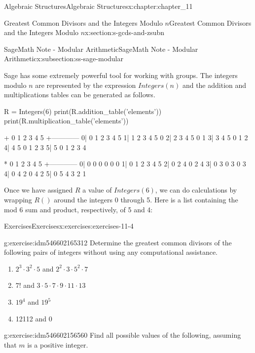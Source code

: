 \documentclass[oneside,10pt,]{book}
\numberwithin{equation}{section}
\begin{document}
\begin{chapterptx}{Algebraic Structures}{}{Algebraic Structures}{}{}{x:chapter:chapter_11}
\begin{sectionptx}{Greatest Common Divisors  and the Integers Modulo \(n\)}{}{Greatest Common Divisors  and the Integers Modulo \(n\)}{}{}{x:section:s-gcds-and-zsubn}
\begin{subsectionptx}{SageMath Note - Modular Arithmetic}{}{SageMath Note - Modular Arithmetic}{}{}{x:subsection:ss-sage-modular}
\begin{sageoutput}
\end{sageoutput}
Sage has some extremely powerful tool for working with groups.  The integers modulo \(n\) are represented by the expression \(Integers(n)\) and the addition and multiplications tables can be generated as follows.%
\begin{sageinput}
R = Integers(6)
print(R.addition_table('elements'))
print(R.multiplication_table('elements'))
\end{sageinput}
\begin{sageoutput}
+  0 1 2 3 4 5
 +------------  
0| 0 1 2 3 4 5
1| 1 2 3 4 5 0
2| 2 3 4 5 0 1
3| 3 4 5 0 1 2
4| 4 5 0 1 2 3
5| 5 0 1 2 3 4

*  0 1 2 3 4 5
 +------------
0| 0 0 0 0 0 0
1| 0 1 2 3 4 5
2| 0 2 4 0 2 4
3| 0 3 0 3 0 3
4| 0 4 2 0 4 2
5| 0 5 4 3 2 1
\end{sageoutput}
Once we have assigned \(R\) a value of \(Integers(6)\),  we can do calculations by wrapping \(R()\) around the integers 0 through 5.  Here is a list containing the mod 6 sum and product, respectively, of 5 and 4:%
\begin{sageinput}
[R(5)+R(4), R(5)*R(4)]
\end{sageinput}
\begin{sageoutput}
[3, 2]
\end{sageoutput}
\end{subsectionptx}
%
%
\typeout{************************************************}
\typeout{************************************************}
%
\begin{exercises-subsection}{Exercises}{}{Exercises}{}{}{x:exercises:exercises-11-4}
\begin{divisionexercise}{1}{}{}{g:exercise:idm546602165312}%
Determine the greatest common divisors of the following pairs of integers without using any computational assistance.%
\begin{enumerate}[label=(\alph*)]
\item{}\(2^3 \cdot 3^2\cdot 5\)   and  \(2^2 \cdot 3 \cdot 5^2\cdot 7\)%
\item{}\(7! \)  and  \(3\cdot 5\cdot 7\cdot 9\cdot 11\cdot 13\)%
\item{}\(19^4\)  and  \(19^5\)%
\item{}12112 and 0%
\end{enumerate}
%
\end{divisionexercise}%
\begin{divisionexercise}{2}{}{}{g:exercise:idm546602156560}%
Find all possible values of the following, assuming that \(m\) is a positive integer.%

\end{divisionexercise}
\end{exercises-subsection}
\end{sectionptx}
\end{chapterptx}
\end{document}
